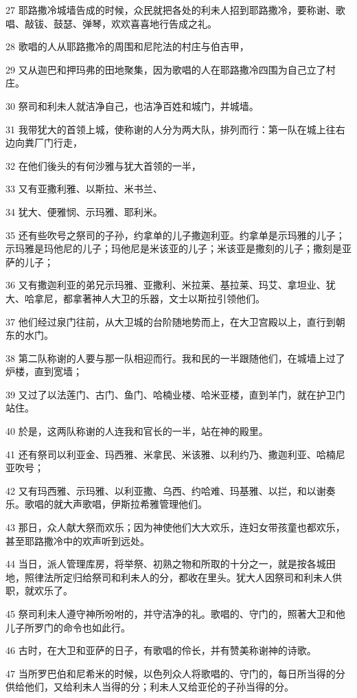 \par 27 耶路撒冷城墙告成的时候，众民就把各处的利未人招到耶路撒冷，要称谢、歌唱、敲钹、鼓瑟、弹琴，欢欢喜喜地行告成之礼。
\par 28 歌唱的人从耶路撒冷的周围和尼陀法的村庄与伯吉甲，
\par 29 又从迦巴和押玛弗的田地聚集，因为歌唱的人在耶路撒冷四围为自己立了村庄。
\par 30 祭司和利未人就洁净自己，也洁净百姓和城门，并城墙。
\par 31 我带犹大的首领上城，使称谢的人分为两大队，排列而行：第一队在城上往右边向粪厂门行走，
\par 32 在他们後头的有何沙雅与犹大首领的一半，
\par 33 又有亚撒利雅、以斯拉、米书兰、
\par 34 犹大、便雅悯、示玛雅、耶利米。
\par 35 还有些吹号之祭司的子孙，约拿单的儿子撒迦利亚。约拿单是示玛雅的儿子；示玛雅是玛他尼的儿子；玛他尼是米该亚的儿子；米该亚是撒刻的儿子；撒刻是亚萨的儿子；
\par 36 又有撒迦利亚的弟兄示玛雅、亚撒利、米拉莱、基拉莱、玛艾、拿坦业、犹大、哈拿尼，都拿著神人大卫的乐器，文士以斯拉引领他们。
\par 37 他们经过泉门往前，从大卫城的台阶随地势而上，在大卫宫殿以上，直行到朝东的水门。
\par 38 第二队称谢的人要与那一队相迎而行。我和民的一半跟随他们，在城墙上过了炉楼，直到宽墙；
\par 39 又过了以法莲门、古门、鱼门、哈楠业楼、哈米亚楼，直到羊门，就在护卫门站住。
\par 40 於是，这两队称谢的人连我和官长的一半，站在神的殿里。
\par 41 还有祭司以利亚金、玛西雅、米拿民、米该雅、以利约乃、撒迦利亚、哈楠尼亚吹号；
\par 42 又有玛西雅、示玛雅、以利亚撒、乌西、约哈难、玛基雅、以拦，和以谢奏乐。歌唱的就大声歌唱，伊斯拉希雅管理他们。
\par 43 那日，众人献大祭而欢乐；因为神使他们大大欢乐，连妇女带孩童也都欢乐，甚至耶路撒冷中的欢声听到远处。
\par 44 当日，派人管理库房，将举祭、初熟之物和所取的十分之一，就是按各城田地，照律法所定归给祭司和利未人的分，都收在里头。犹大人因祭司和利未人供职，就欢乐了。
\par 45 祭司利未人遵守神所吩咐的，并守洁净的礼。歌唱的、守门的，照著大卫和他儿子所罗门的命令也如此行。
\par 46 古时，在大卫和亚萨的日子，有歌唱的伶长，并有赞美称谢神的诗歌。
\par 47 当所罗巴伯和尼希米的时候，以色列众人将歌唱的、守门的，每日所当得的分供给他们，又给利未人当得的分；利未人又给亚伦的子孙当得的分。

